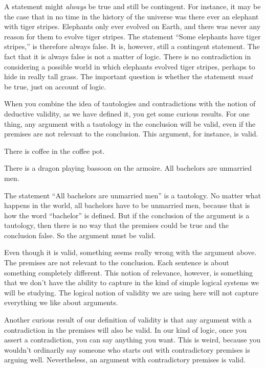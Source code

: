 A statement might \emph{always} be true and still be contingent. For instance, it may be the case that in no time in the history of the universe was there ever an elephant with tiger stripes. Elephants only ever evolved on Earth, and there was never any reason for them to evolve tiger stripes. The statement ``Some elephants have tiger stripes,'' is therefore always false. It is, however, still a contingent statement. The fact that it is always false is not a matter of logic. There is no contradiction in considering a possible world in which elephants evolved tiger stripes, perhaps to hide in really tall grass. The important question is whether the statement \emph{must} be true, just on account of logic.

When you combine the idea of tautologies and contradictions with the notion of deductive validity, as we have defined it, you get some curious results. For one thing, any argument with a tautology in the conclusion will be valid, even if the premises are not relevant to the conclusion. This argument, for instance, is valid.

\begin{earg*}
\item There is coffee in the coffee pot.
\item There is a dragon playing bassoon on the armoire.
\itemc All bachelors are unmarried men.
\end{earg*}

The statement ``All bachelors are unmarried men'' is a tautology. No matter what happens in the world, all bachelors have to be unmarried men, because that is how the word ``bachelor'' is defined. But if the conclusion of the argument is a tautology, then there is no way that the premises could be true and the conclusion false. So the argument must be valid.

Even though it is valid, something seems really wrong with the argument above. The premises are not relevant to the conclusion. Each sentence is about something completely different. This notion of relevance, however, is something that we don't have the ability to capture in the kind of simple logical systems we will be studying. The logical notion of validity we are using here will not capture everything we like about arguments.

Another curious result of our definition of validity is that any argument with a contradiction in the premises will also be valid. In our kind of logic, once you assert a contradiction, you can say anything you want. This is weird, because you wouldn't ordinarily say someone who starts out with contradictory premises is arguing well. Nevertheless, an argument with contradictory premises is valid.

